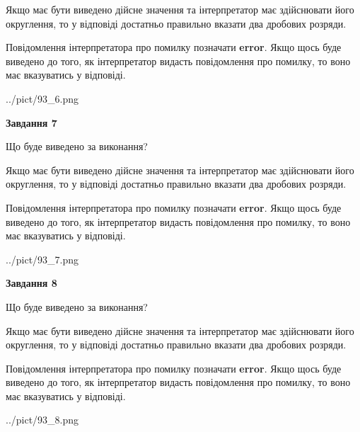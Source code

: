 \documentclass[12pt, ukrainian]{article}
\begin{document}
{\begin {Large}
Якщо має бути виведено дійсне значення та інтерпретатор має здійснювати його округлення, 
то у відповіді достатньо правильно вказати два дробових розряди.

Повідомлення інтерпретатора про помилку позначати \textbf{error}.
Якщо щось буде виведено до того, як інтерпретатор видасть повідомлення про помилку, 
то воно має вказуватись у відповіді. \par

\begin{center}
	{../pict/93_6.png}
\end{center}
\newpage

{\begin {center}\textbf{Завдання 7}\end {center}}\par
Що буде виведено за виконання? \par

Якщо має бути виведено дійсне значення та інтерпретатор має здійснювати його округлення, 
то у відповіді достатньо правильно вказати два дробових розряди.

Повідомлення інтерпретатора про помилку позначати \textbf{error}.
Якщо щось буде виведено до того, як інтерпретатор видасть повідомлення про помилку, 
то воно має вказуватись у відповіді. \par

\begin{center}
	{../pict/93_7.png}
\end{center}
\newpage

{\begin {center}\textbf{Завдання 8}\end {center}}\par
Що буде виведено за виконання? \par

Якщо має бути виведено дійсне значення та інтерпретатор має здійснювати його округлення, 
то у відповіді достатньо правильно вказати два дробових розряди.

Повідомлення інтерпретатора про помилку позначати \textbf{error}.
Якщо щось буде виведено до того, як інтерпретатор видасть повідомлення про помилку, 
то воно має вказуватись у відповіді. \par

\begin{center}
	{../pict/93_8.png}
\end{center}
\newpage


\end{Large}}
\end{document}
